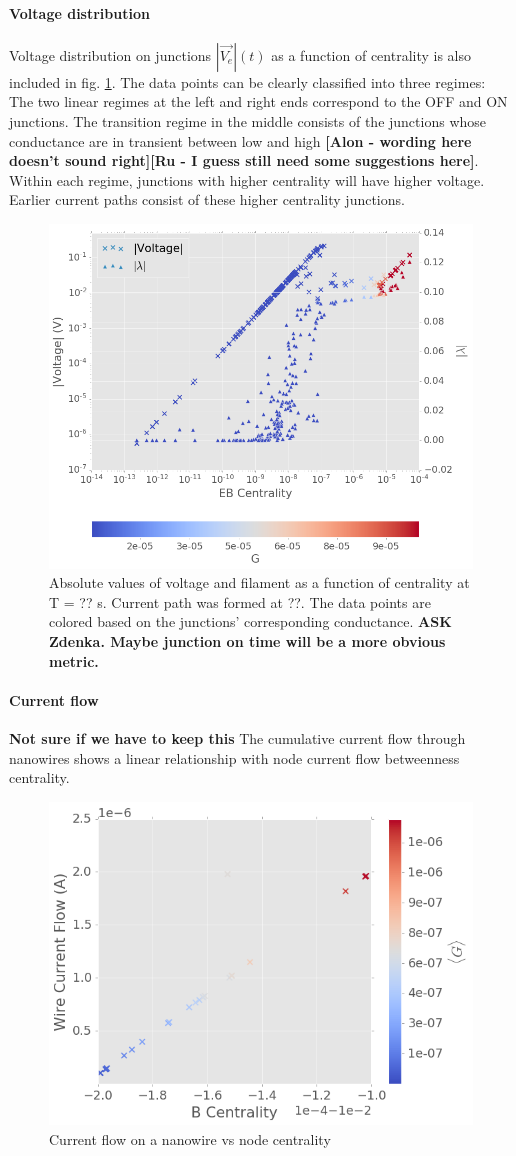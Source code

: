 \documentclass[fleqn,10pt,  amsmath,amssymb,aps]{wlscirep}
\begin{document}
\paragraph{Voltage distribution} 

Voltage distribution on junctions $|\vec{V_e}|(t)$ as a function of centrality is also included in fig. \ref{fig:v_lam_cent}. The data points can be clearly classified into three regimes: The two linear regimes at the left and right ends correspond to the OFF and ON junctions. The transition regime in the middle consists of the junctions whose conductance are in transient between low and high \textbf{[Alon -  wording here doesn't sound right][Ru - I guess still need some suggestions here]}. Within each regime, junctions with higher centrality will have higher voltage. Earlier current paths consist of these higher centrality junctions.

\begin{figure}[h]
	\centering
	\includegraphics[width=0.5\linewidth]{figure/v_lam_cent}
	\caption{Absolute values of voltage and filament as a function of centrality at T = ?? s. Current path was formed at ??. The data points are colored based on the junctions' corresponding conductance. \textbf{ASK Zdenka. Maybe junction on time will be a more obvious metric.}}
	\label{fig:v_lam_cent}
\end{figure}

\paragraph{Current flow}
\textbf{Not sure if we have  to keep this}
The cumulative current flow through nanowires shows a linear relationship with node current flow betweenness centrality. 

\begin{figure}[h]
	\centering
	\includegraphics[width=0.5\linewidth]{figure/I_cent}
	\caption{Current flow on a nanowire vs node centrality}
	\label{fig:i_cent}
\end{figure}
\end{document}
